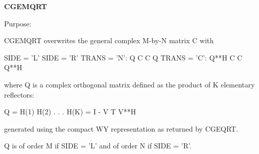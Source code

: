 {\bfseries C\+G\+E\+M\+Q\+R\+T} 

 \begin{DoxyParagraph}{Purpose\+: }
\begin{DoxyVerb} CGEMQRT overwrites the general complex M-by-N matrix C with

                 SIDE = 'L'     SIDE = 'R'
 TRANS = 'N':      Q C            C Q
 TRANS = 'C':    Q**H C            C Q**H

 where Q is a complex orthogonal matrix defined as the product of K
 elementary reflectors:

       Q = H(1) H(2) . . . H(K) = I - V T V**H

 generated using the compact WY representation as returned by CGEQRT. 

 Q is of order M if SIDE = 'L' and of order N  if SIDE = 'R'.\end{DoxyVerb}
 
\end{DoxyParagraph}

